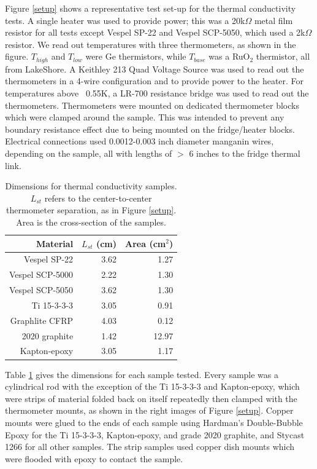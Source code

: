 \documentclass[final]{svjour2}
\begin{document}
Figure \ref{setup} shows a representative test set-up for the thermal conductivity tests. A single heater was used to provide power; this was a 20k$\Omega$ metal film resistor for all tests except Vespel SP-22 and Vespel SCP-5050, which used a 2k$\Omega$ resistor. We read out temperatures with three thermometers, as shown in the figure. $T_{high}$ and $T_{low}$ were Ge thermistors, while $T_{base}$ was a RuO$_2$ thermistor, all from LakeShore\footnotemark.  A Keithley 213 Quad Voltage Source was used to read out the thermometers in a 4-wire configuration and to provide power to the heater. For temperatures above ~0.55K, a LR-700 resistance bridge was used to read out the thermometers. Thermometers were mounted on dedicated thermometer blocks which were clamped around the sample. This was intended to prevent any boundary resistance effect due to being mounted on the fridge/heater blocks. Electrical connections used 0.0012-0.003 inch diameter manganin wires, depending on the sample, all with lengths of $>$ 6 inches to the fridge thermal link.

\begin{table}
\centering
\small
{}
\begin{tabular}{rrr}
\toprule
\textbf{Material} & $L_{st}$ (cm) & Area (cm$^2$) \\\midrule
Vespel SP-22 & 3.62 & 1.27 \\
Vespel SCP-5000 & 2.22 & 1.30 \\
Vespel SCP-5050 & 3.62 & 1.30 \\
Ti 15-3-3-3 & 3.05 & 0.91 \\
Graphlite CFRP & 4.03 & 0.12 \\
2020 graphite & 1.42 & 12.97 \\
Kapton-epoxy & 3.05 & 1.17 \\
\bottomrule
\end{tabular}
\caption{{\small Dimensions for thermal conductivity samples. $L_{st}$ refers to the center-to-center thermometer separation, as in Figure \ref{setup}. Area is the cross-section of the samples.}}
\label{dim}
\end{table}

Table \ref{dim} gives the dimensions for each sample tested. Every sample was a cylindrical rod with the exception of the Ti 15-3-3-3 and Kapton-epoxy, which were strips of material folded back on itself repeatedly then clamped with the thermometer mounts, as shown in the right images of Figure \ref{setup}. Copper mounts were glued to the ends of each sample using Hardman's Double-Bubble Epoxy for the Ti 15-3-3-3, Kapton-epoxy, and grade 2020 graphite, and Stycast 1266 for all other samples. The strip samples used copper dish mounts which were flooded with epoxy to contact the sample.
\end{document}
